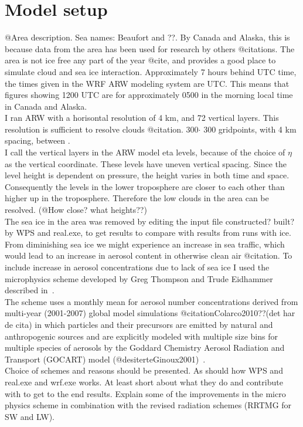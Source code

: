 \section{Model setup}
\label{sec:modelsetup}
@Area description. Sea names: Beaufort and ??. By Canada and Alaska, this is because data from the area has been used for research by others @citations. The area is not ice free any part of the year @cite, and provides a good place to simulate cloud and sea ice interaction. Approximately 7 hours behind UTC time, the times given in the WRF ARW modeling system are UTC. This means that figures showing 1200 UTC are for approximately 0500 in the morning local time in Canada and Alaska.
\\
I ran ARW with a horisontal resolution of 4 km, and 72 vertical layers. This resolution is sufficient to resolve clouds @citation. 300$\cdot$ 300 gridpoints, with 4 km spacing, between .
\\
I call the vertical layers in the ARW model eta levels, because of the choice of $\eta$ as the vertical coordinate. These levels have uneven vertical spacing. Since the level height is dependent on pressure, the height varies in both time and space. Consequently the levels in the lower troposphere are closer to each other than higher up in the troposphere. Therefore the low clouds in the area can be resolved. (@How close? what heights??)
\\
The sea ice in the area was removed by editing the input file constructed? built? by WPS and real.exe, to get results to compare with results from runs with ice.
\\
From diminishing sea ice we might experience an increase in sea traffic, which would lead to an increase in aerosol content in otherwise clean air @citation. To include increase in aerosol concentrations due to lack of sea ice I used the microphysics scheme developed by Greg Thompson and Trude Eidhammer described in~\cite{Thompson2014}.
\\
The scheme uses a monthly mean for aerosol number concentrations derived from multi-year (2001-2007) global model simulations @citationColarco2010??(det har de cita) in which particles and their precursors are emitted by natural and anthropogenic sources and are explicitly modeled with multiple size bins for multiple species of aerosols by the Goddard Chemistry Aerosol Radiation and Transport (GOCART) model (@desiterteGinoux2001)~\citep{Thompson2014}.
\\
Choice of schemes and reasons should be presented. As should how WPS and real.exe and wrf.exe works. At least short about what they do and contribute with to get to the end results. Explain some of the improvements in the micro physics scheme in combination with the revised radiation schemes (RRTMG for SW and LW).

